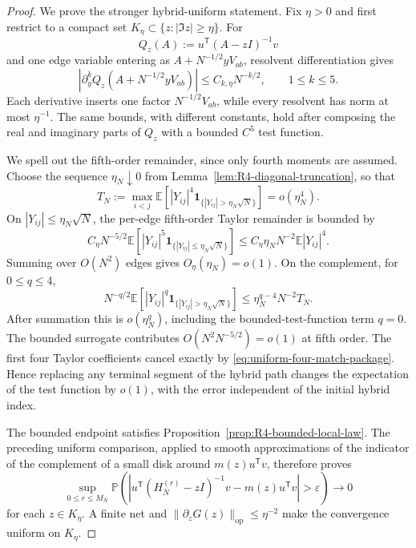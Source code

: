 \documentclass[10pt,a4paper]{amsart}
\newcommand{\E}{\mathbb E}
\newcommand{\op}{\mathrm{op}}
\newcommand{\one}{\mathbf 1}
\newcommand{\norm}[1]{\lVert #1\rVert}
\begin{document}
\begin{proof}
We prove the stronger hybrid-uniform statement.  Fix \(\eta>0\) and first
restrict to a compact set
\(K_\eta\subset\{z:|\Im z|\ge\eta\}\).  For
\[
 Q_z(A):=u^{\mathsf T}(A-zI)^{-1}v
\]
and one edge variable entering as
\(A+N^{-1/2}yV_{ab}\), resolvent differentiation gives
\begin{equation}\label{eq:R4-isotropic-edge-derivatives}
 \left|\partial_y^k
 Q_z(A+N^{-1/2}yV_{ab})\right|
 \le C_{k,\eta}N^{-k/2},
 \qquad 1\le k\le5.
\end{equation}
Each derivative inserts one factor \(N^{-1/2}V_{ab}\), while every
resolvent has norm at most \(\eta^{-1}\).  The same bounds, with different
constants, hold after composing the real and imaginary parts of \(Q_z\) with
a bounded \(C^5\) test function.

We spell out the fifth-order remainder, since only fourth moments are
assumed.  Choose the sequence \(\eta_N\downarrow0\) from
Lemma~\ref{lem:R4-diagonal-truncation}, so that
\[
 T_N:=\max_{i<j}\E\left[|Y_{ij}|^4
 \one_{\{|Y_{ij}|>\eta_N\sqrt N\}}\right]
 =o(\eta_N^4).
\]
On \(|Y_{ij}|\le\eta_N\sqrt N\), the per-edge fifth-order Taylor remainder
is bounded by
\begin{equation}\label{eq:R4-isotropic-fifth-remainder}
 C_\eta N^{-5/2}
 \E\left[|Y_{ij}|^5
 \one_{\{|Y_{ij}|\le\eta_N\sqrt N\}}\right]
 \le C_\eta\eta_NN^{-2}\E|Y_{ij}|^4.
\end{equation}
Summing over \(O(N^2)\) edges gives \(O_\eta(\eta_N)=o(1)\).  On the
complement, for \(0\le q\le4\),
\[
 N^{-q/2}\E\left[|Y_{ij}|^q
 \one_{\{|Y_{ij}|>\eta_N\sqrt N\}}\right]
 \le \eta_N^{q-4}N^{-2}T_N.
\]
After summation this is \(o(\eta_N^q)\), including the bounded-test-function
term \(q=0\).  The bounded surrogate contributes
\(O(N^2N^{-5/2})=o(1)\) at fifth order.  The first four Taylor coefficients
cancel exactly by \eqref{eq:uniform-four-match-package}.  Hence replacing any
terminal segment of the hybrid path changes the expectation of the test
function by \(o(1)\), with the error independent of the initial hybrid
index.

The bounded endpoint satisfies Proposition~\ref{prop:R4-bounded-local-law}.
The preceding uniform comparison, applied to smooth approximations of the
indicator of the complement of a small disk around
\(m(z)u^{\mathsf T}v\), therefore proves
\[
 \sup_{0\le r\le M_N}
 \mathbb P\left(
 \left|u^{\mathsf T}(H_N^{(r)}-zI)^{-1}v
 -m(z)u^{\mathsf T}v\right|>\varepsilon
 \right)\longrightarrow0
\]
for each \(z\in K_\eta\).  A finite net and
\(\norm{\partial_zG(z)}_{\op}\le\eta^{-2}\) make the convergence uniform on
\(K_\eta\).


\end{proof}
\end{document}
